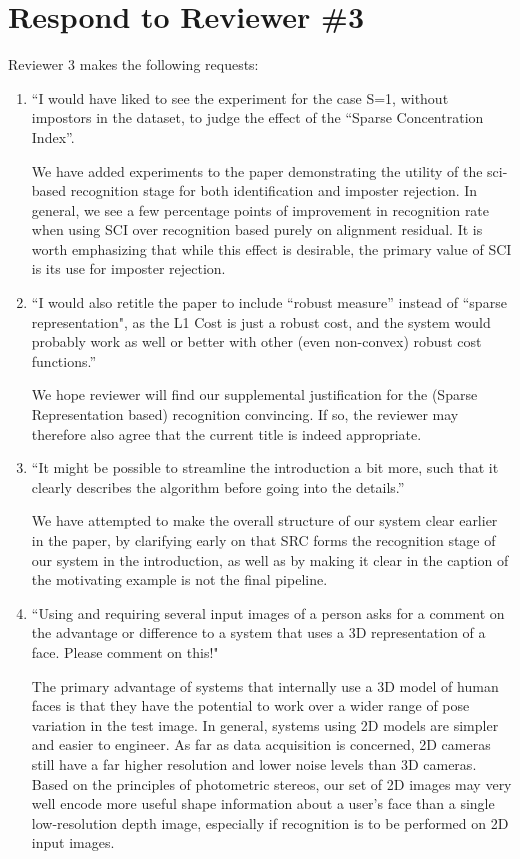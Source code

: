 \documentclass[11pt]{article}
\begin{document}
\section{Respond to Reviewer \#3}
Reviewer 3 makes the following requests:

\begin{enumerate}
\item ``I would have liked to see the experiment for the case S=1, without
impostors in the dataset, to judge the effect of the ``Sparse
Concentration Index''.

We have added experiments to the paper demonstrating the utility of the
sci-based recognition stage for both identification and imposter rejection.  In
general, we see a few percentage points of improvement in recognition rate when
using SCI over recognition based purely on alignment residual.  
It is worth emphasizing that while this effect is desirable, 
the primary value of SCI is its use for imposter rejection. 

\item ``I would also retitle the paper to include ``robust measure''
instead of ``sparse representation", as the L1 Cost is just a robust
cost, and the system would probably work as well or better with other
(even non-convex) robust cost functions.''

We hope reviewer will find our supplemental justification for the (Sparse
Representation based) recognition convincing.  If so, the reviewer may
therefore also agree that the current title is indeed appropriate.

\item ``It might be possible to streamline the introduction a bit more, such that it
clearly describes the algorithm before going into the details.''

We have attempted to make the overall structure of our system clear earlier in the
paper, by clarifying early on that SRC forms the recognition stage of our system
in the introduction, as well as by making it clear in the caption of the motivating example
is not the final pipeline.

\item ``Using and requiring several input images of a person asks for a
comment on the advantage or difference to a system that uses
a 3D representation of a face. Please comment on this!"

The primary advantage of systems that internally use a 3D model of human faces
is that they have the potential to work over a wider range of pose variation in
the test image.  In general, systems using 2D models are simpler and easier to
engineer.  As far as data acquisition is concerned, 2D cameras still have a far
higher resolution and lower noise levels than 3D cameras.  Based on the principles
of photometric stereos, our set of 2D images may very well encode more useful shape 
information about a user's face than a single low-resolution depth image, especially if 
recognition is to be performed on 2D input images.

\end{enumerate}
\end{document}
